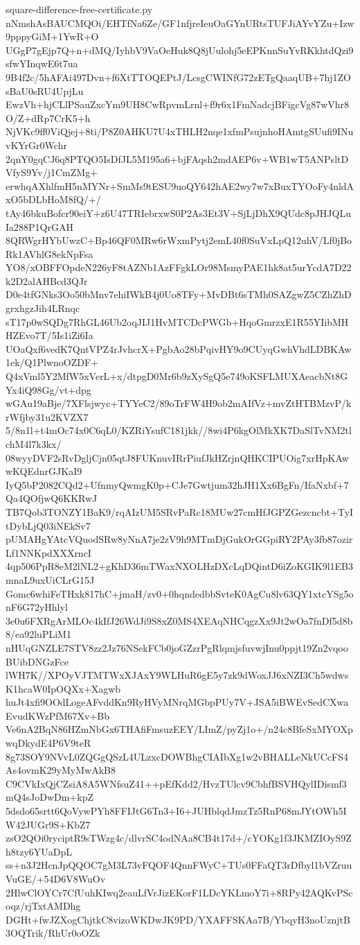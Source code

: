\documentclass[11pt]{article}
\theoremstyle{definition}
\theoremstyle{remark}
\begin{document}
\begin{filecontents*}[overwrite]{square-difference-free-certificate.py}
nNmshAsBAUCMQOi/EHTfNa6Ze/GF1nfjreIeuOaGYnURtsTUFJiAYvYZu+Izw9pppyGiM+1YwR+O
UGgP7gEjp7Q+n+dMQ/IyhbV9VaOeHuk8Q8jUulohj5eEPKnnSuYvRKkhtdQzi9sfwYInqwE6t7ua
9B4f2c/5hAFAi497Dvn+f6XtTTOQEPtJ/LcsgCWINfG72zETgQaaqUB+7hj1ZOsBaU0sRU4UpjLu
EwzVh+hjCLlPSauZxcYm9UH8CwRpvmLrnl+f9r6x1FmNadcjBFigcVg87wVhr8O/Z+dRp7CrK5+h
NjVKc9ff0ViQjej+8ti/P8Z0AHKU7U4xTHLH2nqe1xfmPsujnhoHAmtgSUufi9INuvKYrGr0Wchr
2qnY0gqCJ6q8PTQO5IsDfJL5M195a6+bjFAqsh2mdAEP6v+WB1wT5ANPsltDVfyS9Yv/j1CmZMg+
erwhqAXhlfmH5nMYNr+SmMs9tESU9uoQY642hAE2wy7w7xBuxTYOoFy4nldAxO5bDLbHoM8fQ/+/
tAy46bkuBofcr90eiY+z6U47TRIebrxwS0P2As3Et3V+SjLjDhX9QUdc8pJHJQLuIa288P1QrGAH
8QRWgrHYbUwzC+Bp46QF0MRw6rWxmPytj2emL40f0SuVxLpQ12uhV/Lf0jBoRk1AVhlG8ekNpFsa
YO8/xOBFFOpdeN226yF8tAZNb1AzFFgkLOr98MsmyPAE1hk8at5urYcdA7D22k2D2alAHBcd3QJr
D0e4tfGNks3Oo50bMnv7ehiIWkB4j0Uo8TFy+MvDBt6sTMh0SAZgwZ5CZhZhDgrxhgzJih4LRnqc
sT17p0wSQDg7RhGL46Ub2oqJIJ1HvMTCDcPWGb+HqoGmrzxE1R55YIibMHHZEvo7T/5Is1iZi6Ia
UOaQxf6vedK7QntVPZ4rJvhcrX+PgbAo28bPqivHY9o9CUyqGwhVhdLDBKAw1ek/Q1PlwnoOZDF+
Q4xVml5Y2MfW5xVerL+x/dtpgD0Mr6b9zXySgQ5e749oKSFLMUXAeacbNt8GYx4iQ98Gg/vt+dpg
wGAu19aBje/7XFlsjwyc+TYYeC2/89oTrFW4H9ob2mAIfVz+mvZtHTBMzvP/krWfjby31u2KVZX7
5/8n1l+t4mOc74x0C6qL0/KZRiYsufC181jkk//8wi4P6kgOlMkXK7DaSlTvNM2tlchM4l7k3kx/
08wyyDVF2sRvDgljCjn05qtJ8FUKnuvIRrPiufJkHZrjnQHKCIPUOig7xrHpKAwwKQEdnrGJKaI9
IyQ5bP2082CQd2+UfnmyQwmgK0p+CJe7Gwtjum32hJH1Xx6BgFn/IfaNxbf+7Qa4QOfjwQ6KKRwJ
TB7Qob3TONZY1BaK9/rqAIzUM5SRvPaRc18MUw27cmHfJGPZGezcncbt+TyItDybLjQ03iNEkSv7
pUMAHgYAtcVQuodSRw8yNnA7je2zV9h9MTmDjGukOrGGpiRY2PAy3fb87ozirLf1NNKpdXXXrncI
4qp506PpR8eM2lNL2+gKhD36mTWaxNXOLHzDXcLqDQintD6iZoKGIK9l1EB3mnaL9uxUiCLrG15J
Gomc6whiFeTHxk817hC+jmaH/zv0+0hqndedbbSvteK0AgCu8lv63QY1xtcYSg5onF6G72yHhlyl
3e0u6FXRgArMLOc4kIfJ26WdJi9S8xZ0MS4XEAqNHCqgzXx9Jt2wOa7fnDf5d8b8/ea92luPLiM1
nHUqGNZLE7STV8zz2Jz76NSekFCb0joGZzrPgRlqmjsfuvwjInu0ppjt19Zn2vqooBUibDNGzFce
lWH7K//XPOyVJTMTWxXJAxY9WLHuR6gE5y7zk9dWoxJJ6xNZI3Ch5wdwsK1hcaW0IpOQXx+Xagwb
huJt4xfi9OOdLogeAFvddKn9RyHVyMNrqMGbpPUy7V+JSA5iBWEvSedCXwaEvudKWzPfM67Xv+Bb
Ve6nA2BqN86HZmNbGx6THAfiFmsuzEEY/LImZ/pyZj1o+/n24c8BfeSxMYOXpwqDkydE4P6V9teR
8g73SOY9NVvL0ZQGgQSzL4ULzxcDOWBhgCIAIbXg1w2vBHALLeNkUCcFS4As4ovmK29yMyMwAkB8
C9CVkIxQjCZsiA8A5WNfsuZ41++pEfKdd2/HvzTUlcv9CbhfBSVHQylIDismf3mQ4sJoDwDm+kpZ
5dsdo65srtt6QoVywPYh8FFIJtG6Tn3+I6+JUHblqdJmzTz5RnP68mJYtOWh5IW42JUGr9S+KbZ7
zsO2QOi0ryciptR9sTWzg4c/dlvrSC4odNAa8CB4t17d+/cYOKg1f3JKMZIOyS9Zh8tzy6YUaDpL
ss+n3J2HcnJpQQOC7gM3L73vFQOF4QnnFWyC+TUs0FFaQT3rDfbyl1bVZruuVuGE/+54D6V8WuOv
2HlwClOYCr7CfUuhKIwq2eauLfVrJizEKorF1LDcYKLmoY7i+8RPy42AQKvPScoqz/rjTxtAMDhg
DGHt+fwJZXogChjtkC8vizoWKDwJK9PD/YXAFFSKAa7B/YbqyH3noUznjtB3OQTrik/RhUr0oOZk

\end{filecontents*}
\end{document}
